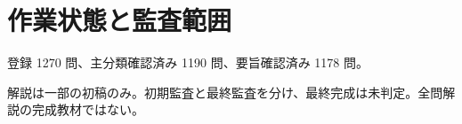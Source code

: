 \chapter{作業状態と監査範囲}
登録 1270 問、主分類確認済み 1190 問、要旨確認済み 1178 問。
\par 解説は一部の初稿のみ。初期監査と最終監査を分け、最終完成は未判定。全問解説の完成教材ではない。
